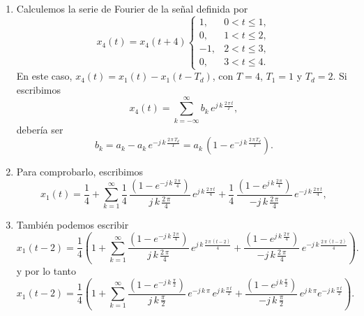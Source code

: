 \begin{enumerate}
\item  Calculemos la serie de Fourier de la se\~{n}al definida por 
\begin{equation}
x_{4}\left( t\right) = x_{4}(t+4) \left\{
\begin{array}{cc}
1, & 0 < t \leq 1, \\
0, & 1 < t \leq 2, \\ 
-1, & 2 < t \leq 3, \\
0, & 3 < t \leq 4.
\end{array}
\right. \label{squarewave}
\end{equation}
En este caso, $x_{4}(t) = x_{1}(t) - x_{1}(t-T_{d})$, con $T = 4$, $T_{1} = 1$ y $T_{d} = 2$. Si escribimos
\begin{equation}
	x_{4}(t) = \sum_{k=-\infty}^{\infty} b_{k} \, e^{j \, k \, \frac{2 \, \pi \, t}{T}},
\end{equation}
debería ser
\begin{equation}
	b_{k} = a_{k} - a_{k} \, e^{-j \, k \, \frac{2 \, \pi \, T_{d}}{T}} = a_{k} \, (1 - e^{-j \, k \, \frac{2 \, \pi \, T_{d}}{T}}).
\end{equation}

\item Para comprobarlo, escribimos
\begin{equation}
	x_{1}(t) = \frac{1}{4} + \sum_{k=1}^{\infty} 
     \frac{1}{4} \, \frac{\left(1 - e^{-j \, k \, \frac{2 \, \pi}{4}}\right)}{j \, k \, \frac{2 \, \pi}{4}} \, e^{j \, k \, \frac{2 \, \pi \, t}{4}}
     +
     \frac{1}{4} \, \frac{\left(1 - e^{j \, k \, \frac{2 \, \pi}{4}}\right)}{-j \, k \, \frac{2 \, \pi}{4}} \, e^{-j \, k \, \frac{2 \, \pi \, t}{4}},
\end{equation}
\item También podemos escribir
\begin{equation}
	x_{1}(t-2) = \frac{1}{4} \left(1 + \sum_{k=1}^{\infty} 
	\frac{\left(1 - e^{-j \, k \, \frac{2 \, \pi}{4}}\right)}{j \, k \, \frac{2 \, \pi}{4}} \, e^{j \, k \, \frac{2 \, \pi \, (t-2)}{4}}
	+
	\frac{\left(1 - e^{j \, k \, \frac{2 \, \pi}{4}}\right)}{-j \, k \, \frac{2 \, \pi}{4}} \, e^{-j \, k \, \frac{2 \, \pi \, (t-2)}{4}}\right).
\end{equation}
y por lo tanto
\begin{equation}
	x_{1}(t-2) = \frac{1}{4} \left(1 + \sum_{k=1}^{\infty} 
	\frac{\left(1 - e^{-j \, k \, \frac{\pi}{2}}\right)}{j \, k \, \frac{\pi}{2}} \, e^{-j \, k \, \pi} \,
	e^{j \, k \, \frac{\pi \, t}{2}}
	+
	\frac{\left(1 - e^{j \, k \, \frac{\pi}{2}}\right)}{-j \, k \, \frac{\pi}{2}} \, e^{j \, k \, \pi}
	e^{-j \, k \, \frac{\pi \, t}{2}} \right).
\end{equation}


\end{enumerate}
